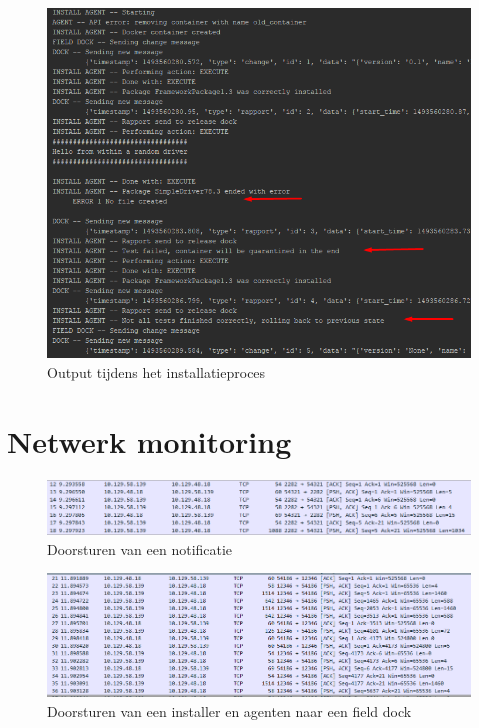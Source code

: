 \begin{figure}
\centering
\includegraphics[scale=0.9]{afbeelding/badPackage/installatieProces.png}
\caption{Output tijdens het installatieproces}
\label{fig:badPackage:tijdens}
\end{figure}

\clearpage
\section{Netwerk monitoring}\label{sec:network}
\begin{figure}
\centering
\includegraphics[scale=0.9]{afbeelding/network/broker_notification.png}
\caption{Doorsturen van een notificatie}
\label{fig:network:notification}
\end{figure}

\begin{figure}
\centering
\includegraphics[scale=0.9]{afbeelding/network/installatieDoorsturen.png}
\caption{Doorsturen van een installer en agenten naar een field dock}
\label{fig:network:installatie}
\end{figure}

